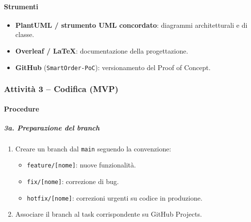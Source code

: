 \documentclass[a4paper, 11pt, oneside]{scrartcl}
\begin{document}
\paragraph{Strumenti}
\begin{itemize}
    \item \textbf{PlantUML / strumento UML concordato}: diagrammi architetturali e di classe.
    \item \textbf{Overleaf / \LaTeX{}}: documentazione della progettazione.
    \item \textbf{GitHub} (\texttt{SmartOrder-PoC}): versionamento del Proof of Concept.
\end{itemize}

\subsubsection{Attività 3 – Codifica (MVP)}

\paragraph{Procedure}

\subparagraph{3a. Preparazione del branch}
\begin{enumerate}
    \item Creare un branch dal \texttt{main} seguendo la convenzione:
    \begin{itemize}
        \item \texttt{feature/[nome]}: nuove funzionalità.
        \item \texttt{fix/[nome]}: correzione di bug.
        \item \texttt{hotfix/[nome]}: correzioni urgenti su codice in produzione.
    \end{itemize}
    \item Associare il branch al task corrispondente su GitHub Projects.
\end{enumerate}
\end{document}

